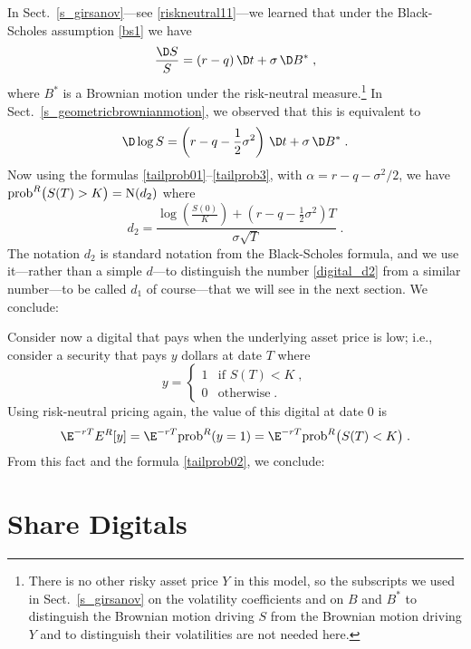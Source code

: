 In Sect.~\ref{s_girsanov}---see  \eqref{riskneutral11}---we learned that under the 
Black-Scholes assumption \eqref{bs1} we have
$$\frac{\D S}{S} =( r-q)\,\D t+\sigma\,\D B^*\; ,$$
where $B^*$ is a Brownian motion under the risk-neutral measure.\footnote{There is no other risky asset price $Y$ in this model, so the subscripts we used in Sect.~\ref{s_girsanov} on the volatility coefficients and on $B$ and $B^*$ to distinguish the Brownian motion driving $S$ from the Brownian motion driving $Y$ and to distinguish their volatilities are not needed here.}
In Sect.~\ref{s_geometricbrownianmotion}, we observed that this is equivalent to
$$\D \log S = \left(r-q-\frac{1}{2}\sigma^2\right)\,\D t + \sigma\,\D B^*\; .$$
Now using the formulas \eqref{tailprob01}--\eqref{tailprob3}, with $\alpha = r-q-\sigma^2/2$, we have $\text{prob}^R\big(S(T) > K\big) = \operatorname{N}(d_2)$ where 
\begin{equation}\label{digital_d2}
d_2 = \frac{\log\left(\frac{S(0)}{K}\right)+\left(r-q-\frac{1}{2}\sigma^2\right)T}{\sigma\sqrt{T}}\;.
\end{equation}
The notation $d_2$ is standard notation from the Black-Scholes formula, and we use it---rather than a simple $d$---to distinguish the number \eqref{digital_d2} from a similar number---to be called $d_1$ of course---that we will see in the next section.  
We conclude:

Consider now a digital that pays when the underlying asset price is low; i.e., consider a security that pays $y$ dollars at date $T$ where
\begin{equation*}
y =  \begin{cases} 1 & \text{if $S(T)<K$}\; ,\\
0 & \text{otherwise}\;.
\end{cases}
\end{equation*}
Using risk-neutral pricing again, the value of this digital at date 0 is 
$$\E^{-rT}E^R[y] = \E^{-rT}\text{prob}^R(y=1) = \E^{-rT}\text{prob}^R\big(S(T)<K\big)\; .$$
From this fact and the formula \eqref{tailprob02}, we conclude:

\section{Share Digitals}\label{s_sharedigitals}


